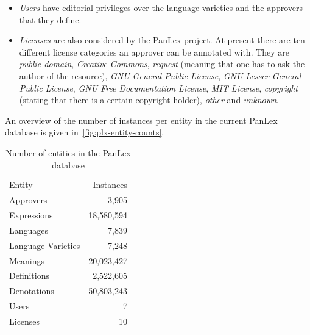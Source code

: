 \documentclass[sw]{iosart2c}
\begin{document}
\begin{itemize}
  Denotations may be enriched with part-of-speech tags selected from a closed list based on the
  Open Lexicon Interchange Format (OLIF) standard\footnote{\url{http://www.olif.net/}}.
  For example, \emph{fall} can be a verb or a noun for autumn.
  Furthermore, it is possible to generically tag denotations with metadata
  using key-value pairs.
  For instance, an English expression \emph{pig} when synonymous with
  \emph{police officer} could be annotated with \emph{pragmatics=vulgar}.
  \item \emph{Users} have editorial privileges over the language varieties and the approvers that they define.
  \item \emph{Licenses} are also considered by the PanLex project.
  At present there are ten different license categories an approver can be annotated with.
  They are \emph{public domain}, \emph{Creative Commons}, \emph{request} (meaning that one has to ask the author of the resource), \emph{GNU General Public License}, \emph{GNU Lesser General Public License}, \emph{GNU Free Documentation License}, \emph{MIT License}, \emph{copyright} (stating that there is a certain copyright holder), \emph{other} and \emph{unknown}.
\end{itemize}

An overview of the number of instances per entity in the current PanLex database is given in~\autoref{fig:plx-entity-counts}.
\begin{table}
\centering
\begin{scriptsize}
\begin{tabular}{lr}
\toprule
Entity & Instances \\
Approvers & 3,905 \\ %
Expressions & 18,580,594 \\ %
Languages   & 7,839 \\ %
Language Varieties & 7,248 \\ %
Meanings    & 20,023,427 \\ %
Definitions & 2,522,605 \\ %
Denotations & 50,803,243 \\ %
Users       & 7 \\ %
Licenses    & 10 \\ %
\bottomrule
\end{tabular}
\end{scriptsize}
\caption{Number of entities in the PanLex database}
\label{fig:plx-entity-counts}
\end{table}
\end{document}
